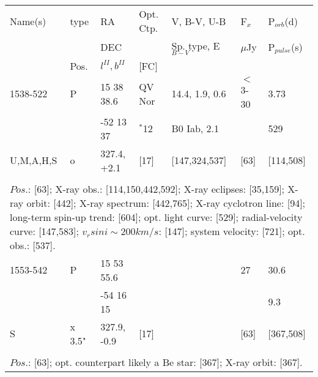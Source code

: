 \documentclass{aa}
\begin{document}
\clearpage\begin{table*}[h]
\begin{tabular}{p{2.5cm}p{1cm}p{1.8cm}p{2.3cm}p{3.3cm}p{2.0cm}p{2.2cm}}
\noalign{\smallskip}
\multicolumn{7}{p{17.5cm}}{Table 1.  (continued) }\\        
\hline
\noalign{\smallskip}
Name(s)      & type  & RA                       &  Opt. Ctp. & V, B-V, U-B                    &   F$_{x}$           & P$_{orb}$(d)    \\
                      &            &  DEC                   &                     &  Sp. type, E$_{B-V}$  &    $\mu$Jy        & P$_{pulse}$(s) \\
                      & Pos.  &  $l^{II}, b^{II}$     &  [FC]           &                                          &                            &                             \\
\noalign{\smallskip} 
\hline
\noalign{\smallskip}
 1538-522     &   P      & 15 38 38.6       & QV Nor             & 14.4, 1.9, 0.6          &   $<$3-30          &  3.73            \\
                       &            & -52 13 37         &   $^*$12             & B0 Iab, 2.1             &                           &   529             \\
U,M,A,H,S    &  o       & 327.4, +2.1       &     [17]                &    [147,324,537]     &        [63]            & [114,508]    \\
\\
\multicolumn{7}{p{17.5cm}}{
$Pos$.: [63]; X-ray obs.: [114,150,442,592]; X-ray eclipses: [35,159]; X-ray orbit: [442];
X-ray spectrum: [442,765]; X-ray cyclotron line: [94]; long-term spin-up trend: [604]; opt. light curve: [529]; 
radial-velocity curve: [147,583]; $v_rsin i \sim 200 km/s$: [147]; system velocity: [721]; opt. obs.: [537].}\\

\noalign{\smallskip}
\hline
\noalign{\smallskip}
 1553-542     &   P      & 15 53 55.6       &                    &                        &     27             &  30.6            \\
                       &            & -54 16 15         &                    &                        &                       &   9.3             \\
     S               & x 3.5" & 327.9, -0.9       &     [17]        &                        &        [63]        & [367,508]   \\
\\
\multicolumn{7}{p{17.5cm}}{
$Pos$.: [63]; opt. counterpart likely a Be star: [367]; X-ray orbit: [367].}\\


\end{tabular}
\end{table*}
\end{document}
